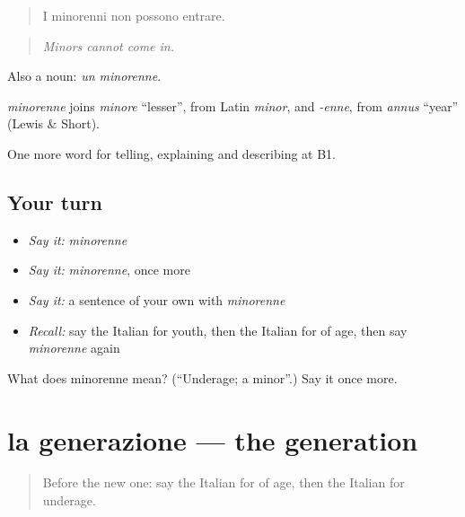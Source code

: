 \begin{quote}
I minorenni non possono entrare.
\end{quote}

\begin{quote}
\emph{Minors cannot come in.}
\end{quote}

Also a noun: \emph{un minorenne}.

\begin{cousinweb}
\emph{minorenne} joins \emph{minore} \textquotedblleft{}lesser\textquotedblright{}, from Latin \emph{minor}, and \emph{-enne}, from \emph{annus} \textquotedblleft{}year\textquotedblright{} (Lewis \& Short).
\end{cousinweb}

\begin{grammarlens}[title={What you've built}]
One more word for telling, explaining and describing at B1.
\end{grammarlens}

\subsection*{Your turn}
\begin{itemize}
\raggedright
  \item \emph{Say it:} \emph{minorenne}
  \item \emph{Say it:} \emph{minorenne}, once more
  \item \emph{Say it:} a sentence of your own with \emph{minorenne}
  \item \emph{Recall:} say the Italian for youth, then the Italian for of age, then say \emph{minorenne} again
\end{itemize}

\begin{tcolorbox}[breakable,colback=teal!4,colframe=teal!35!black,title={Before you move on}]
What does minorenne mean? (\textquotedblleft{}Underage; a minor\textquotedblright{}.) Say it once more.
\end{tcolorbox}
\section[la generazione]{la generazione — the generation}

\label{lesson:IT-C309-generazione}



\begin{quote}
Before the new one: say the Italian for of age, then the Italian for underage.
\end{quote}

